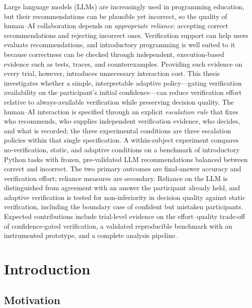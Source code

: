 \documentclass[oneside,final,14pt,a4paper]{extreport}
\begin{document}
Large language models (LLMs) are increasingly used in programming education,
but their recommendations can be plausible yet incorrect, so the quality of
human--AI collaboration depends on \emph{appropriate reliance}: accepting
correct recommendations and rejecting incorrect ones. Verification support can
help users evaluate recommendations, and introductory programming is well
suited to it because correctness can be checked through independent,
execution-based evidence such as tests, traces, and counterexamples. Providing
such evidence on every trial, however, introduces unnecessary interaction cost.
This thesis investigates whether a simple, interpretable adaptive policy---gating
verification availability on the participant's initial confidence---can reduce
verification effort relative to always-available verification while preserving
decision quality. The human--AI interaction is specified through an explicit
\emph{escalation rule} that fixes who recommends, who supplies independent
verification evidence, who decides, and what is recorded; the three
experimental conditions are three escalation policies within that single
specification. A within-subject
experiment compares no-verification, static, and adaptive conditions on a
benchmark of introductory Python tasks with frozen, pre-validated LLM
recommendations balanced between correct and incorrect. The two primary
outcomes are final-answer accuracy and verification effort; reliance measures
are secondary. Reliance on the LLM is distinguished from agreement with an
answer the participant already held, and adaptive verification is tested for
non-inferiority in decision quality against static verification, including the
boundary case of confident but mistaken participants. Expected contributions
include trial-level evidence on the effort--quality trade-off of
confidence-gated verification, a validated reproducible benchmark with an
instrumented prototype, and a complete analysis pipeline.

\newpage

\chapter{Introduction}
\label{chap:intro}

\section{Motivation}
\label{sec:motivation}
\end{document}
